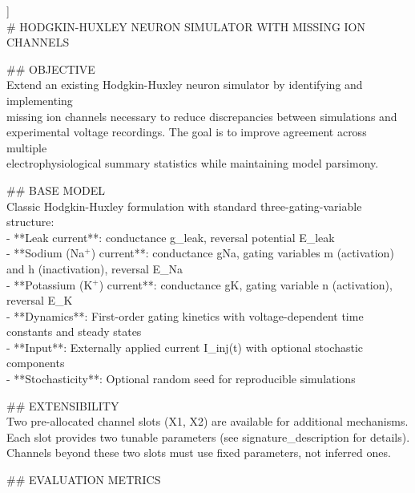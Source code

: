 \begin{tcolorbox}[
  breakable, enhanced,
  title={User},
  colback=UserBg, colframe=UserFrame,
  coltitle=white, fonttitle=\bfseries\small,
  arc=2mm, boxrule=1pt,
  before upper={\small\setlength{\parindent}{0pt}\setlength{\parskip}{2pt}},
]
\par\noindent [[ \#\# system\_description \#\# ]]\\
\noindent
\# HODGKIN-HUXLEY NEURON SIMULATOR WITH MISSING ION CHANNELS
\par\smallskip
\#\# OBJECTIVE\\{}
Extend an existing Hodgkin-Huxley neuron simulator by identifying and implementing\\{}
missing ion channels necessary to reduce discrepancies between simulations and\\{}
experimental voltage recordings. The goal is to improve agreement across multiple\\{}
electrophysiological summary statistics while maintaining model parsimony.
\par\smallskip
\#\# BASE MODEL\\{}
Classic Hodgkin-Huxley formulation with standard three-gating-variable structure:\\{}
- **Leak current**: conductance g\_leak, reversal potential E\_leak\\{}
- **Sodium (Na$^{+}$) current**: conductance gNa, gating variables m (activation) and h (inactivation), reversal E\_Na\\{}
- **Potassium (K$^{+}$) current**: conductance gK, gating variable n (activation), reversal E\_K\\{}
- **Dynamics**: First-order gating kinetics with voltage-dependent time constants and steady states\\{}
- **Input**: Externally applied current I\_inj(t) with optional stochastic components\\{}
- **Stochasticity**: Optional random seed for reproducible simulations
\par\smallskip
\#\# EXTENSIBILITY\\{}
Two pre-allocated channel slots (X1, X2) are available for additional mechanisms.\\{}
Each slot provides two tunable parameters (see signature\_description for details).\\{}
Channels beyond these two slots must use fixed parameters, not inferred ones.
\par\smallskip
\#\# EVALUATION METRICS\\{}

\end{tcolorbox}
